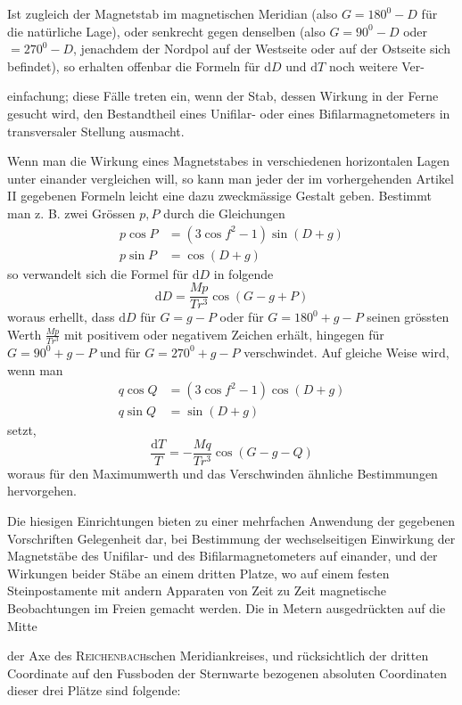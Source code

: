 Ist zugleich der Magnetstab im magnetischen Meridian (also $G=180^0-D$ für die natürliche Lage), oder senkrecht gegen denselben (also $G=90^0-D$ oder $=270^0-D$, jenachdem der Nordpol auf der Westseite oder auf der Ostseite sich befindet), so erhalten offenbar die Formeln für $\mathrm{d}D$ und $\mathrm{d}T$ noch weitere Ver-
\par\clearpage
{}
\noindent einfachung; diese Fälle treten ein, wenn der Stab, dessen Wirkung in der Ferne gesucht wird, den Bestandtheil eines Unifilar- oder eines Bifilarmagnetometers in transversaler Stellung ausmacht.

Wenn man die Wirkung eines Magnetstabes in verschiedenen horizontalen Lagen unter einander vergleichen will, so kann man jeder der im vorhergehenden Artikel II gegebenen Formeln leicht eine dazu zweckmässige Gestalt geben. Bestimmt man z. B. zwei Grössen $p,P$ durch die Gleichungen
\[
\begin{aligned}
p\cos P&=(3\cos f^2-1)\sin(D+g)\\
p\sin P&=\cos(D+g)
\end{aligned}
\]
so verwandelt sich die Formel für $\mathrm{d}D$ in folgende
\[
\mathrm{d}D=\frac{Mp}{Tr^3}\cos(G-g+P)
\]
woraus erhellt, dass $\mathrm{d}D$ für $G=g-P$ oder für $G=180^0+g-P$ seinen grössten Werth $\frac{Mp}{Tr^3}$ mit positivem oder negativem Zeichen erhält, hingegen für $G=90^0+g-P$ und für $G=270^0+g-P$ verschwindet. Auf gleiche Weise wird, wenn man
\[
\begin{aligned}
q\cos Q&=(3\cos f^2-1)\cos(D+g)\\
q\sin Q&=\sin(D+g)
\end{aligned}
\]
setzt,
\[
\frac{\mathrm{d}T}{T}=-\frac{Mq}{Tr^3}\cos(G-g-Q)
\]
woraus für den Maximumwerth und das Verschwinden ähnliche Bestimmungen hervorgehen.

Die hiesigen Einrichtungen bieten zu einer mehrfachen Anwendung der gegebenen Vorschriften Gelegenheit dar, bei Bestimmung der wechselseitigen Einwirkung der Magnetstäbe des Unifilar- und des Bifilarmagnetometers auf einander, und der Wirkungen beider Stäbe an einem dritten Platze, wo auf einem festen Steinpostamente mit andern Apparaten von Zeit zu Zeit magnetische Beobachtungen im Freien gemacht werden. Die in Metern ausgedrückten auf die Mitte
\par\clearpage
{}
\noindent der Axe des \textsc{Reichenbach}schen Meridiankreises, und rücksichtlich der dritten Coordinate auf den Fussboden der Sternwarte bezogenen absoluten Coordinaten dieser drei Plätze sind folgende:

